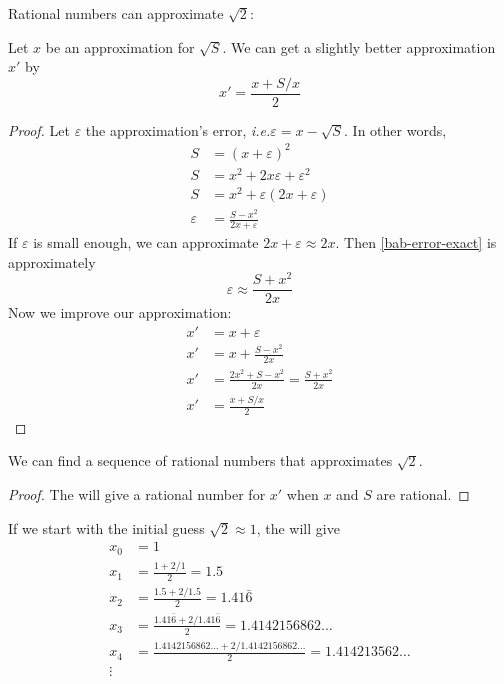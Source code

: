 \documentclass{scrbook}
\newcommand{\ie}{\emph{i.e.}\xspace}
\begin{document}
Rational numbers can approximate $\sqrt 2$:
\begin{theorem}
  \label{th:babylon}
  Let $x$ be an approximation for $\sqrt S$. We can get a slightly better approximation $x'$ by
  \[
  x'=\frac{x+S/x}{2}
  \]
\end{theorem}
\begin{proof}
Let $\varepsilon$ the approximation's error, \ie $\varepsilon = x-\sqrt S$.
  In other words,
  \begin{align}
    S &= (x+\varepsilon)^2 \nonumber\\
    S &= x^2+2x\varepsilon + \varepsilon^2 \nonumber\\
    S&= x^2+\varepsilon(2x+\varepsilon) \nonumber\\
    \varepsilon &= \frac{S-x^2}{2x+\varepsilon}\label{bab-error-exact}
  \end{align}
  If $\varepsilon$ is small enough, we can approximate $2x+\varepsilon \approx 2x$. Then \cref{bab-error-exact} is approximately
  \[
  \varepsilon \approx \frac {S+x^2}{2x}
  \]
  Now we improve our approximation:
  \begin{align*}
    x' &= x+\varepsilon \\
    x' &= x+ \frac{S-x^2}{2x} \\
    x' &= \frac{2x^2+S-x^2}{2x}=\frac{S+x^2}{2x} \\
    x' &= \frac{x+S/x}{2}
  \end{align*}
\end{proof}
\begin{cor}
  We can find a sequence of rational numbers that approximates $\sqrt{2}$.
\end{cor}
\begin{proof}
The  will give a rational number for $x'$ when $x$ and $S$ are rational. 
\end{proof}
\begin{example}
  If we start with the initial guess $\sqrt 2 \approx 1$, the  will give 
  \begin{align*}
    x_0&=1 \\
    x_1 &= \frac{1+2/1}2 = 1.5 \\
    x_2 &= \frac{1.5+2/1.5}2 = 1.41\bar6 \\
    x_3 &= \frac{1.41\bar6 +2/1.41\bar6}2 = 1.4142156862\dots \\
    x_4 &= \frac{1.4142156862\dots+2/1.4142156862\dots}2 = 1.414213562\dots \\
        \vdots
  \end{align*}
\end{example}
\end{document}
